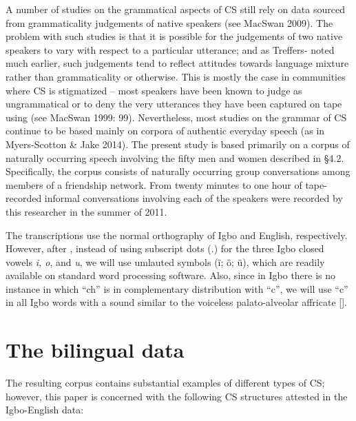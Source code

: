 \documentclass[output=paper]{langsci/langscibook}
\begin{document}
A number of studies on the grammatical aspects of CS still rely on data sourced from grammaticality judgements of native speakers (see MacSwan 2009). The problem with such studies is that it is possible for the judgements of two native speakers to vary with respect to a particular utterance; and as Treffers-\citet{Daller1991} noted much earlier, such judgements tend to reflect attitudes towards language mixture rather than grammaticality or otherwise. This is mostly the case in communities where CS is stigmatized – most speakers have been known to judge as ungrammatical or to deny the very utterances they have been captured on tape using (see MacSwan 1999: 99). Nevertheless, most studies on the grammar of CS continue to be based mainly on corpora of authentic everyday speech (as in Myers-Scotton \& Jake 2014). The present study is based primarily on a corpus of naturally occurring speech involving the fifty men and women described in §4.2. Specifically, the corpus consists of naturally occurring group conversations among members of a friendship network. From twenty minutes to one hour of tape-recorded informal conversations involving each of the speakers were recorded by this researcher in the summer of 2011. 

The transcriptions use the normal orthography of Igbo and English, respectively. However, after \citet{Echeruo1998}, instead of using subscript dots (.) for the three Igbo closed vowels \textit{i, o}, and \textit{u}, we will use umlauted symbols (ï; ö; \"{u}), which are readily available on standard word processing software. Also, since in Igbo there is no instance in which “ch” is in complementary distribution with “c”, we will use “c” in all Igbo words with a sound similar to the voiceless palato-alveolar affricate []. 

\section{The bilingual data}

The resulting corpus contains substantial examples of different types of CS; however, this paper is concerned with the following CS structures attested in the Igbo-English data:
\end{document}
